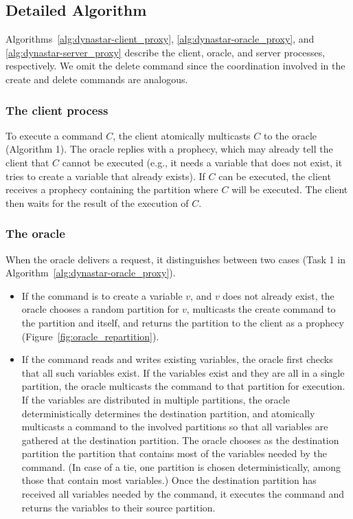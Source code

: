 \subsection{Detailed Algorithm}
\label{sec:dynastar-algo}

\label{sec:dynastar-detailed}






Algorithms~\ref{alg:dynastar-client_proxy}, \ref{alg:dynastar-oracle_proxy}, and
\ref{alg:dynastar-server_proxy} describe the client, oracle, and server processes,
respectively. We omit the delete command since the coordination involved in the
create and delete commands are analogous.

\subsubsection{The client process}

To execute a command $C$, the client atomically multicasts $C$ to the oracle
(Algorithm 1). The oracle replies with a prophecy, which may already tell the
client that $C$ cannot be executed (e.g., it needs a variable that does not
exist, it tries to create a variable that already exists). If $C$ can be
executed, the client receives a prophecy containing the partition where $C$ will
be executed. The client then waits for the result of the execution of $C$.

\subsubsection{The oracle}

When the oracle delivers a request, it distinguishes between two cases (Task 1
in Algorithm~\ref{alg:dynastar-oracle_proxy}).
\begin{itemize}
\item If the command is to create a variable $v$, and $v$ does not already
exist, the oracle chooses a random partition for $v$, multicasts the create
command to the partition and itself, and returns the partition to the client as
a prophecy (Figure~\ref{fig:oracle_repartition}).
\item If the command reads and writes existing variables, the oracle first
checks that all such variables exist. If the variables exist and they are all in
a single partition, the oracle multicasts the command to that partition for
execution. If the variables are distributed in multiple partitions, the oracle
deterministically determines the destination partition, and atomically
multicasts a command to the involved partitions so that all variables are
gathered at the destination partition. The oracle chooses as the destination
partition the partition that contains most of the variables needed by the
command. (In case of a tie, one partition is chosen deterministically, among
those that contain most variables.) Once the destination partition has received
all variables needed by the command, it executes the command and returns the
variables to their source partition.

\end{itemize}


